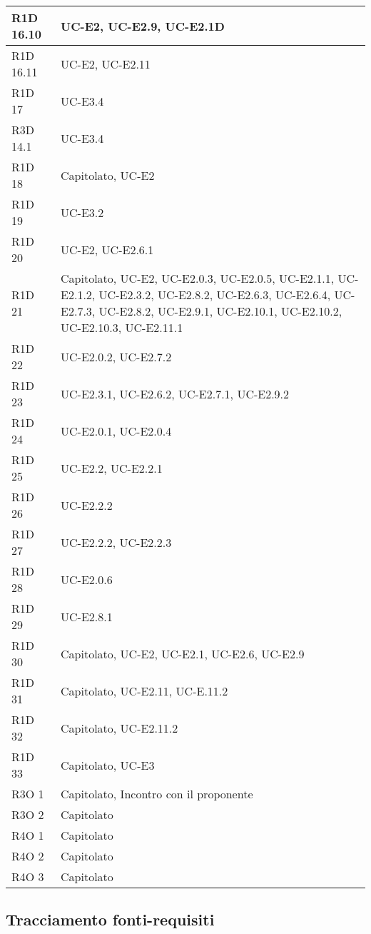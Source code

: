 \begin{center}
\begin{longtable}{ | l | p{8cm} | }
    R1D 16.10 & UC-E2, UC-E2.9, UC-E2.1D \\ \hline
    R1D 16.11 & UC-E2, UC-E2.11 \\ \hline
    R1D 17 &  UC-E3.4  \\ \hline
    R3D 14.1 & UC-E3.4 \\ \hline
    R1D 18 & Capitolato, UC-E2  \\ \hline
    R1D 19 & UC-E3.2 \\ \hline
    R1D 20 & UC-E2, UC-E2.6.1 \\ \hline
    R1D 21 & Capitolato, UC-E2, UC-E2.0.3, UC-E2.0.5, UC-E2.1.1, UC-E2.1.2, UC-E2.3.2, UC-E2.8.2, UC-E2.6.3, UC-E2.6.4, UC-E2.7.3, UC-E2.8.2, UC-E2.9.1, UC-E2.10.1, UC-E2.10.2, UC-E2.10.3, UC-E2.11.1 \\ \hline
    R1D 22 & UC-E2.0.2, UC-E2.7.2 \\ \hline
    R1D 23 & UC-E2.3.1, UC-E2.6.2, UC-E2.7.1, UC-E2.9.2 \\ \hline
    R1D 24 & UC-E2.0.1, UC-E2.0.4 \\ \hline
    R1D 25 & UC-E2.2, UC-E2.2.1 \\ \hline
    R1D 26 & UC-E2.2.2 \\ \hline
    R1D 27 & UC-E2.2.2, UC-E2.2.3  \\ \hline
    R1D 28 & UC-E2.0.6  \\ \hline
    R1D 29 & UC-E2.8.1 \\ \hline
    R1D 30 & Capitolato, UC-E2, UC-E2.1, UC-E2.6, UC-E2.9 \\ \hline
    R1D 31 & Capitolato, UC-E2.11, UC-E.11.2 \\ \hline
    R1D 32 & Capitolato, UC-E2.11.2 \\ \hline
    R1D 33 & Capitolato, UC-E3 \\ \hline
    R3O 1 & Capitolato, Incontro con il proponente\\ \hline
    R3O 2 & Capitolato \\ \hline
    R4O 1 & Capitolato \\ \hline
    R4O 2 & Capitolato \\ \hline
    R4O 3 & Capitolato \\ \hline
    \end{longtable}
  \egroup
\end{center} 

\subsection{Tracciamento fonti-requisiti}

